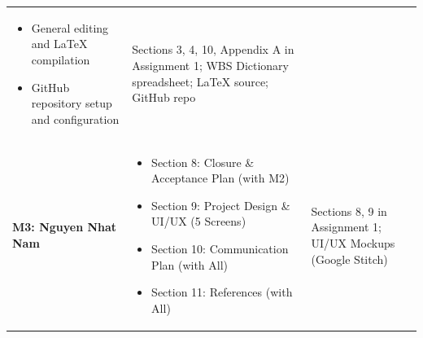 \documentclass[11pt, a4paper]{article}
\begin{document}
\begin{tcolorbox}[formbox, title=\textbf{2. Team Task \& Contribution Log}]
\begin{tabularx}{\linewidth}{@{}L{3cm} L{6.5cm} Y@{}}
\begin{itemize}[before=\vspace{-1.2em}]
      \item General editing and LaTeX compilation
      \item GitHub repository setup and configuration
    \end{itemize} &
    Sections 3, 4, 10, Appendix A in Assignment 1; WBS Dictionary spreadsheet; LaTeX source; GitHub repo \\
    \textbf{M3: Nguyen Nhat Nam} &
    \begin{itemize}[before=\vspace{-1.2em}]
      \item Section 8: Closure \& Acceptance Plan (with M2)
      \item Section 9: Project Design \& UI/UX (5 Screens)
      \item Section 10: Communication Plan (with All)
      \item Section 11: References (with All)
    \end{itemize} &
    Sections 8, 9 in Assignment 1; UI/UX Mockups (Google Stitch) \\
    \bottomrule
  \end{tabularx}
\end{tcolorbox}

\newpage
\end{document}
